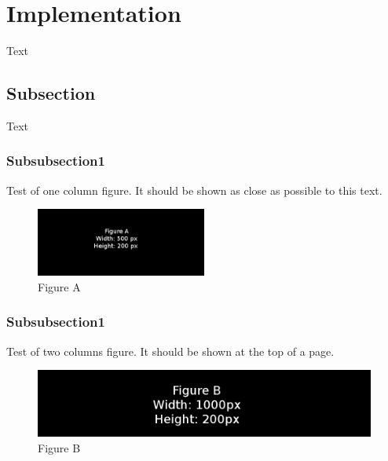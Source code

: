\section{Implementation}\label{sec:implementation}
Text

\subsection{Subsection}
Text
\subsubsection{Subsubsection1}
Test of one column figure. It should be shown as close as possible to this
text.
\begin{figure}[h]
    \includegraphics[width=0.5\textwidth]{./figure/figureA.png}
    \caption{Figure A}
\end{figure}

\subsubsection{Subsubsection1}
Test of two columns figure. It should be shown at the top of a page.
\begin{figure}[t]
    \includegraphics[width=1.0\textwidth]{./figure/figureB.png}
    \caption{Figure B}
\end{figure}

